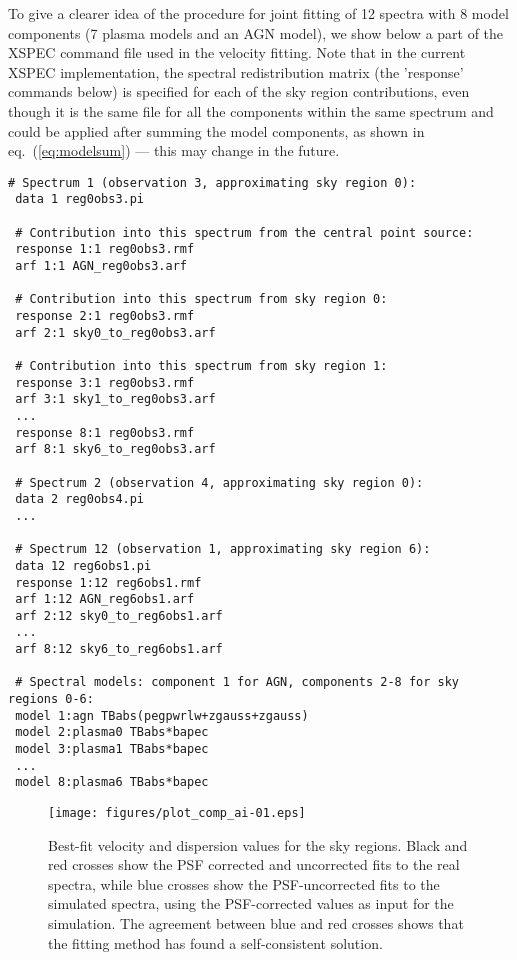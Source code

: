 To give a clearer idea of the procedure for joint fitting of 12 spectra with 8 model components (7 plasma models and an AGN model), we show below a part of the {\small XSPEC} command file used in the velocity fitting. Note that in the current {\small XSPEC} implementation, the spectral redistribution matrix (the 'response' commands below) is specified for each of the sky region contributions, even though it is the same file for all the components within the same spectrum and could be applied after summing the model components, as shown in eq.\ (\ref{eq:modelsum}) --- this may change in the future.

\begin{lstlisting}[basicstyle=\ttfamily\scriptsize, frame=single]
 # Spectrum 1 (observation 3, approximating sky region 0):
 data 1 reg0obs3.pi

 # Contribution into this spectrum from the central point source:
 response 1:1 reg0obs3.rmf
 arf 1:1 AGN_reg0obs3.arf

 # Contribution into this spectrum from sky region 0:
 response 2:1 reg0obs3.rmf
 arf 2:1 sky0_to_reg0obs3.arf

 # Contribution into this spectrum from sky region 1:
 response 3:1 reg0obs3.rmf
 arf 3:1 sky1_to_reg0obs3.arf
 ... 
 response 8:1 reg0obs3.rmf
 arf 8:1 sky6_to_reg0obs3.arf
 
 # Spectrum 2 (observation 4, approximating sky region 0):
 data 2 reg0obs4.pi
 ...
 
 # Spectrum 12 (observation 1, approximating sky region 6):
 data 12 reg6obs1.pi
 response 1:12 reg6obs1.rmf
 arf 1:12 AGN_reg6obs1.arf
 arf 2:12 sky0_to_reg6obs1.arf
 ...
 arf 8:12 sky6_to_reg6obs1.arf

 # Spectral models: component 1 for AGN, components 2-8 for sky regions 0-6:
 model 1:agn TBabs(pegpwrlw+zgauss+zgauss)
 model 2:plasma0 TBabs*bapec
 model 3:plasma1 TBabs*bapec
 ...
 model 8:plasma6 TBabs*bapec
\end{lstlisting}

\begin{figure*}
 \begin{center}
  \texttt{[image: figures/plot\_comp\_ai-01.eps]}
 \end{center}
 \caption{Best-fit velocity and dispersion values for the sky regions. Black and red crosses show the PSF corrected and uncorrected fits to the real spectra, while blue crosses show the PSF-uncorrected fits to the simulated spectra, using the PSF-corrected values as input for the simulation. The agreement between blue and red crosses shows that the fitting method has found a self-consistent solution.}
 \label{fig:forward}
\end{figure*}


